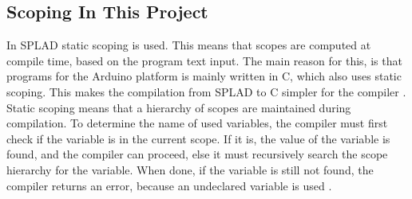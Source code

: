 \subsection{Scoping In This Project}
In SPLAD static scoping is used. This means that scopes are computed at compile time, based on the program text input. The main reason for this, is that programs for the Arduino platform is mainly written in C, which also uses static scoping. This makes the compilation from SPLAD to C simpler for the compiler \citep{arduinobuild}. Static scoping means that a hierarchy of scopes are maintained during compilation. To determine the name of used variables, the compiler must first check if the variable is in the current scope. If it is, the value of the variable is found, and the compiler can proceed, else it must recursively search the scope hierarchy for the variable. When done, if the variable is still not found, the compiler returns an error, because an undeclared variable is used \citep{sebesta}.
